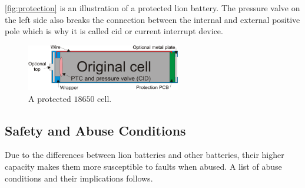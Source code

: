 \autoref{fig:protection} is an illustration of a protected \gls{lion} battery. The pressure valve on the left side also breaks the connection between the internal and external positive pole which is why it is called \gls{cid} or current interrupt device.
\begin{figure}[H]
	\centering
	\includegraphics[width=0.6\textwidth]{Figures/protection.png}
	\caption{A protected $18650$ cell.}
	\label{fig:protection}
\end{figure}

\subsection{Safety and Abuse Conditions}
Due to the differences between \gls{lion} batteries and other batteries, their higher capacity makes them more susceptible to faults when abused. A list of abuse conditions and their implications follows\cite[p.35-38]{book}.

